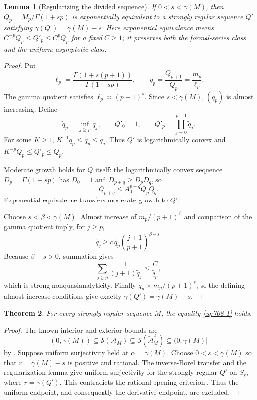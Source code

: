 \documentclass[11pt,a4paper]{article}
\newtheorem{theorem}{Theorem}[section]
\newtheorem{lemma}[theorem]{Lemma}
\theoremstyle{remark}
\begin{document}
\begin{lemma}[Regularizing the divided sequence]
If $0<s<\gamma(M)$, then $Q_p=M_p/\Gamma(1+sp)$ is exponentially
equivalent to a strongly regular sequence $Q'$ satisfying
$\gamma(Q')=\gamma(M)-s$.
Here exponential equivalence means
$C^{-p}Q_p\le Q'_p\le C^pQ_p$ for a fixed $C\ge1$; it preserves both
the formal-series class and the uniform-asymptotic class.
\end{lemma}

\begin{proof}
Put
\[
 \ell_p=\frac{\Gamma(1+s(p+1))}{\Gamma(1+sp)},\qquad
 q_p=\frac{Q_{p+1}}{Q_p}=\frac{m_p}{\ell_p}.
\]
The gamma quotient satisfies $\ell_p\asymp(p+1)^s$.
Since $s<\gamma(M)$, $(q_p)$ is almost increasing.  Define
\[
 \widetilde q_p=\inf_{j\ge p}q_j,\qquad
 Q'_0=1,\qquad Q'_p=\prod_{j=0}^{p-1}\widetilde q_j.
\]
For some $K\ge1$, $K^{-1}q_p\le\widetilde q_p\le q_p$.
Thus $Q'$ is logarithmically convex and
$K^{-p}Q_p\le Q'_p\le Q_p$.

Moderate growth holds for $Q$ itself: the logarithmically convex
sequence $D_p=\Gamma(1+sp)$ has $D_0=1$ and
$D_{p+q}\ge D_pD_q$, so
\[
 Q_{p+q}\le A_0^{p+q}Q_pQ_q.
\]
Exponential equivalence transfers moderate growth to $Q'$.

Choose $s<\beta<\gamma(M)$.  Almost increase of
$m_p/(p+1)^\beta$ and comparison of the gamma quotient imply, for
$j\ge p$,
\[
 \widetilde q_j\ge c\,\widetilde q_p
 \left(\frac{j+1}{p+1}\right)^{\beta-s}.
\]
Because $\beta-s>0$, summation gives
\[
 \sum_{j\ge p}\frac1{(j+1)\widetilde q_j}
 \le\frac{C}{\widetilde q_p},
\]
which is strong nonquasianalyticity.
Finally $\widetilde q_p\asymp m_p/(p+1)^s$, so the defining
almost-increase conditions give exactly
$\gamma(Q')=\gamma(M)-s$.
\end{proof}

\begin{theorem}
For every strongly regular sequence $M$, the equality \eqref{eq:708-1} holds.
\end{theorem}

\begin{proof}
The known interior and exterior bounds are
\[
 (0,\gamma(M))\subseteq\mathcal S(\mathcal A_M)
 \subseteq\mathcal S(\widetilde{\mathcal A}^{u}_M)
 \subseteq(0,\gamma(M)]
\]
by \cite[Corollary 4.19]{JimenezSanzSchindl2019}.
Suppose uniform surjectivity held at $\alpha=\gamma(M)$.
Choose $0<s<\gamma(M)$ so that $r=\gamma(M)-s$ is positive and
rational.  The inverse-Borel transfer and the regularization lemma
give uniform surjectivity for the strongly regular $Q'$ on $S_r$,
where $r=\gamma(Q')$.  This contradicts the rational-opening criterion
\cite[Theorem 4.17]{JimenezSanzSchindl2019}.
Thus the uniform endpoint, and consequently the derivative endpoint,
are excluded.
\end{proof}
\end{document}
